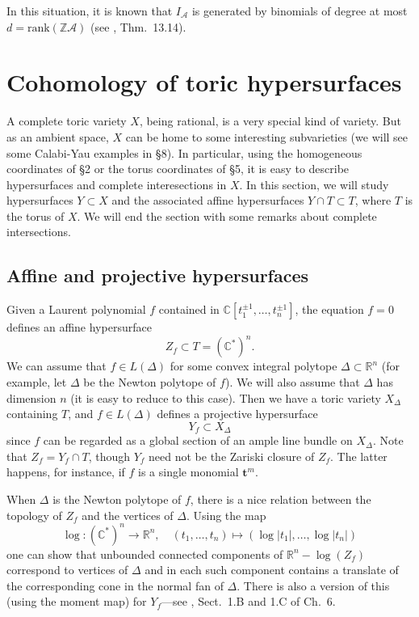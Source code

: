 \documentclass{amsart}
\theoremstyle{plain}
\theoremstyle{definition}
\begin{document}
	In this situation, it is known that $I_{\mathcal{A}}$ is generated
by binomials of degree at most $d = \mathrm{rank}(\mathbb{Z}\mathcal{A})$
(see \cite{Stu2}, Thm.~13.14).
	
\section{Cohomology of toric hypersurfaces} 

	A complete toric variety $X$, being rational, is a very
special kind of variety.  But as an ambient space, $X$ can be home to
some interesting subvarieties (we will see some Calabi-Yau examples in
\S8).  In particular, using the homogeneous coordinates of \S2 or the
torus coordinates of \S5, it is easy to describe hypersurfaces and
complete interesections in $X$.  In this section, we will study
hypersurfaces $Y \subset X$ and the associated affine hypersurfaces
$Y\cap T \subset T$, where $T$ is the torus of $X$.  We will end the
section with some remarks about complete intersections.

	\subsection{Affine and projective hypersurfaces}
Given a Laurent polynomial $f$ contained in  $\mathbb{C}[t_1^{\pm1},\dots,t_n^{\pm1}]$, the equation $f=0$ defines an
affine hypersurface
\[
Z_f \subset T = (\mathbb{C}^*)^n.
\]
We can assume that $f \in L(\Delta)$ for some convex integral polytope
$\Delta \subset \mathbb{R}^n$ (for example, let $\Delta$ be the Newton
polytope of $f$).  We will also assume that $\Delta$ has dimension
$n$ (it is easy to reduce to this case).  Then we have a toric variety
$X_\Delta$ containing $T$, and $f \in L(\Delta)$ defines a projective
hypersurface
\[
Y_f \subset X_\Delta
\]
since $f$ can be regarded as a global section of an ample line bundle
on $X_\Delta$.  Note that $Z_f = Y_f \cap T$, though $Y_f$ need not be
the Zariski closure of $Z_f$.  The latter happens, for instance, if
$f$ is a single monomial $\mathbf{t}^m$.

	When $\Delta$ is the Newton polytope of $f$, there is a nice
relation between the topology of $Z_f$ and the vertices of $\Delta$.
Using the map
\begin{equation}
\log : (\mathbb{C}^*)^n \longrightarrow \mathbb{R}^n,\quad (t_1,\dots,t_n)
\mapsto (\log|t_1|,\dots,\log|t_n|)
\tag{6.1}\label{eq:6.1}
\end{equation}
one can show that unbounded connected components of $\mathbb{R}^n -
\log(Z_f)$ correspond to vertices of $\Delta$ and in each such
component contains a translate of the corresponding cone in the normal
fan of $\Delta$.  There is also a version of this (using the moment
map) for $Y_f$---see \cite{GKZ1}, Sect.~1.B and 1.C of Ch.~6.
\end{document}
